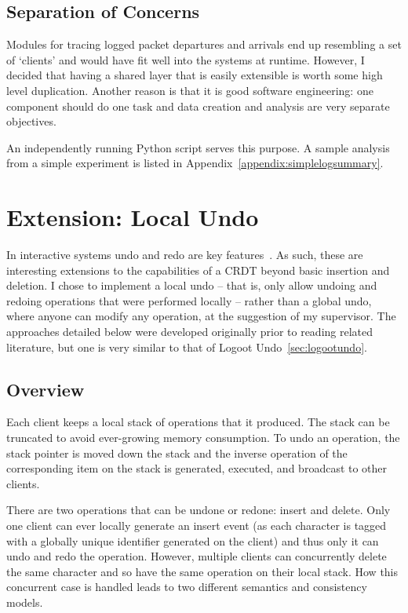 \documentclass[12pt,a4paper,twoside,openright]{report}
\begin{document}
	
	\subsection{Separation of Concerns}
	
	Modules for tracing logged packet departures and arrivals end up resembling a set of `clients' and would have fit well into the systems at runtime. However, I decided that having a shared layer that is easily extensible is worth some high level duplication. Another reason is that it is good software engineering: one component should do one task and data creation and analysis are very separate objectives.
	
	An independently running Python script serves this purpose. A sample analysis from a simple experiment is listed in Appendix~\ref{appendix:simplelogsummary}.	
	
	
	
\section{Extension: Local Undo} \label{sec:undo}
	
	In interactive systems undo and redo are key features~\cite{shneiderman1982}. As such, these are interesting extensions to the capabilities of a CRDT beyond basic insertion and deletion. I chose to implement a local undo -- that is, only allow undoing and redoing operations that were performed locally -- rather than a global undo, where anyone can modify any operation, at the suggestion of my supervisor. The approaches detailed below were developed originally prior to reading related literature, but one is very similar to that of Logoot Undo~\cref{sec:logootundo}.
	
	\subsection{Overview}
	Each client keeps a local stack of operations that it produced. The stack can be truncated to avoid ever-growing memory consumption. To undo an operation, the stack pointer is moved down the stack and the inverse operation of the corresponding item on the stack is generated, executed, and broadcast to other clients.
	
	There are two operations that can be undone or redone: insert and delete. Only one client can ever locally generate an insert event (as each character is tagged with a globally unique identifier generated on the client) and thus only it can undo and redo the operation. However, multiple clients can concurrently delete the same character and so have the same operation on their local stack. How this concurrent case is handled leads to two different semantics and consistency models.
	
\end{document}

